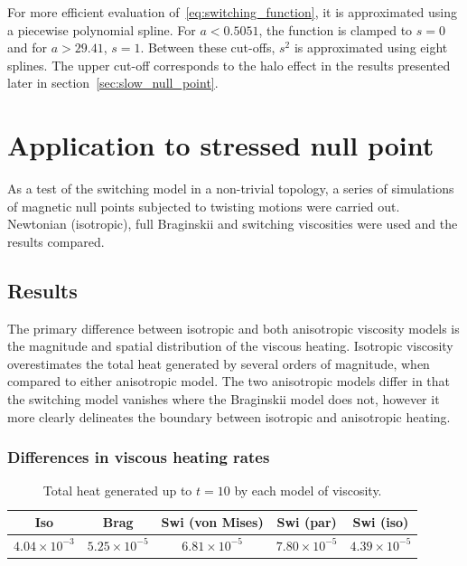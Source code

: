 For more efficient evaluation of~\ref{eq:switching_function}, it is approximated using a piecewise polynomial spline. For $a < 0.5051$, the function is clamped to $s=0$ and for $a > 29.41$, $s=1$. Between these cut-offs, $s^2$ is approximated using eight splines. The upper cut-off corresponds to the halo effect in the results presented later in section~\ref{sec:slow_null_point}.



\section{Application to stressed null point}


\label{sec:slow_null_point}

As a test of the switching model in a non-trivial topology, a series of simulations of magnetic null points subjected to twisting motions were carried out. Newtonian (isotropic), full Braginskii and switching viscosities were used and the results compared.


\subsection{Results}

\label{sec:slow_null_results}

The primary difference between isotropic and both anisotropic viscosity models is the magnitude and spatial distribution of the viscous heating. Isotropic viscosity overestimates the total heat generated by several orders of magnitude, when compared to either anisotropic model. The two anisotropic models differ in that the switching model vanishes where the Braginskii model does not, however it more clearly delineates the boundary between isotropic and anisotropic heating.

\subsubsection{Differences in viscous heating rates}

\begin{table}[t]
  \centering
  \caption{Total heat generated up to $t=10$ by each model of viscosity.}
  \label{tab:total_heating_slow_null}
  \begin{tabular}{ccccc}
Iso & Brag & Swi (von Mises) & Swi (par) & Swi (iso)\\
\midrule
$4.04 \times 10^{-3}$ & $5.25 \times 10^{-5}$ & $6.81 \times 10^{-5}$ & $7.80 \times 10^{-5}$ & $4.39 \times 10^{-5}$
\end{tabular}
\end{table}

